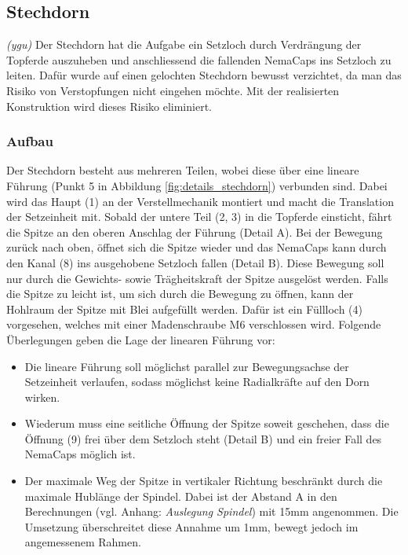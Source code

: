 \subsection{Stechdorn}
\textit{(ygu)} Der Stechdorn hat die Aufgabe ein Setzloch durch Verdrängung der Topferde auszuheben und anschliessend die fallenden NemaCaps ins Setzloch zu leiten. Dafür wurde auf einen gelochten Stechdorn bewusst verzichtet, da man das Risiko von Verstopfungen nicht eingehen möchte. Mit der realisierten Konstruktion wird dieses Risiko eliminiert. 
\subsubsection{Aufbau}
Der Stechdorn besteht aus mehreren Teilen, wobei diese über eine lineare Führung (Punkt 5 in Abbildung \ref{fig:details_stechdorn}) verbunden sind. Dabei wird das Haupt (1) an der Verstellmechanik montiert und macht die Translation der Setzeinheit mit. Sobald der untere Teil (2, 3) in die Topferde einsticht, fährt die Spitze an den oberen Anschlag der Führung (Detail A). Bei der Bewegung zurück nach oben, öffnet sich die Spitze wieder und das NemaCaps kann durch den Kanal (8) ins ausgehobene Setzloch fallen (Detail B). Diese Bewegung soll nur durch die Gewichts- sowie Trägheitskraft der Spitze ausgelöst werden. Falls die Spitze zu leicht ist, um sich durch die Bewegung zu öffnen, kann der Hohlraum der Spitze mit Blei aufgefüllt werden. Dafür ist ein Füllloch (4) vorgesehen, welches mit einer Madenschraube M6 verschlossen wird. Folgende Überlegungen geben die Lage der linearen Führung vor:
\begin{itemize}
	\item Die lineare Führung soll möglichst parallel zur Bewegungsachse der Setzeinheit verlaufen, sodass möglichst keine Radialkräfte auf den Dorn wirken.
	
	\item Wiederum muss eine seitliche Öffnung der Spitze soweit geschehen, dass die Öffnung (9) frei über dem Setzloch steht (Detail B) und ein freier Fall des NemaCaps möglich ist.
	
	\item Der maximale Weg der Spitze in vertikaler Richtung beschränkt durch die maximale Hublänge der Spindel. Dabei ist der Abstand A in den Berechnungen (vgl. Anhang: \textit{Auslegung Spindel}) mit 15mm angenommen. Die Umsetzung überschreitet diese Annahme um 1mm, bewegt jedoch im angemessenem Rahmen.
\end{itemize}

